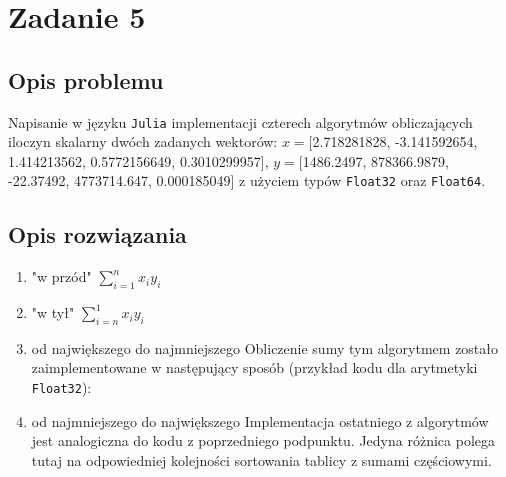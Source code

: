 \documentclass{classrep}
\begin{document}
\section{Zadanie 5}
	\subsection{Opis problemu}
		Napisanie w języku \texttt{Julia} implementacji czterech algorytmów obliczających iloczyn skalarny dwóch 
		zadanych wektorów: 
		$x=$[2.718281828, -3.141592654, 1.414213562, 0.5772156649, 0.3010299957], 
		$y=$[1486.2497, 878366.9879, -22.37492, 4773714.647, 0.000185049] z użyciem typów \texttt{Float32} oraz 
		\texttt{Float64}.
	\subsection{Opis rozwiązania}
		\begin{enumerate}
			\item "w przód"
			\newline
			$\sum_{i=1}^{n} x_iy_i$
			
%					
			
			
			\item "w tył"
			\newline
			$\sum_{i=n}^{1} x_iy_i$
			\newline
			
			\item od największego do najmniejszego
			\newline
			Obliczenie sumy tym algorytmem zostało zaimplementowane w następujący sposób (przykład kodu dla arytmetyki \texttt{Float32}):
%
%
%
%			
			
			
			\item od najmniejszego do największego
			\newline
			Implementacja ostatniego z algorytmów jest analogiczna do kodu z poprzedniego podpunktu. Jedyna różnica polega tutaj na odpowiedniej kolejności sortowania tablicy z sumami częściowymi.			
		\end{enumerate}
\end{document}

